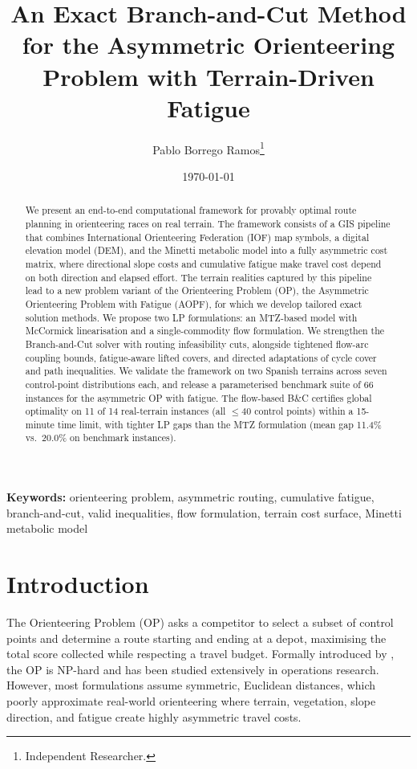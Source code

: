 \documentclass[11pt,a4paper]{article}
\title{An Exact Branch-and-Cut Method for the Asymmetric Orienteering Problem with Terrain-Driven Fatigue}
\author{
  Pablo Borrego Ramos\thanks{Independent Researcher.}
}
\date{\today}
\begin{document}
\maketitle

\begin{abstract}
We present an end-to-end computational framework for provably optimal route planning in orienteering races on real terrain.
The framework consists of a GIS pipeline that combines International Orienteering Federation (IOF) map symbols, a digital elevation model (DEM), and the Minetti metabolic model into a fully asymmetric cost matrix, where directional slope costs and cumulative fatigue make travel cost depend on both direction and elapsed effort.
The terrain realities captured by this pipeline lead to a new problem variant of the Orienteering Problem (OP), the Asymmetric Orienteering Problem with Fatigue (AOPF), for which we develop tailored exact solution methods.
We propose two LP formulations: an MTZ-based model with McCormick linearisation and a single-commodity flow formulation.
We strengthen the Branch-and-Cut solver with routing infeasibility cuts, alongside tightened flow-arc coupling bounds, fatigue-aware lifted covers, and directed adaptations of cycle cover and path inequalities.
We validate the framework on two Spanish terrains across seven control-point distributions each, and release a parameterised benchmark suite of 66 instances for the asymmetric OP with fatigue.
The flow-based B\&C certifies global optimality on 11 of 14 real-terrain instances (all $\leq 40$ control points) within a 15-minute time limit, with tighter LP gaps than the MTZ formulation (mean gap 11.4\% vs.\ 20.0\% on benchmark instances).
\end{abstract}

\noindent\textbf{Keywords:} orienteering problem, asymmetric routing, cumulative fatigue, branch-and-cut, valid inequalities, flow formulation, terrain cost surface, Minetti metabolic model

\section{Introduction}
\label{sec:intro}

The Orienteering Problem (OP) asks a competitor to select a subset of control points and determine a route starting and ending at a depot, maximising the total score collected while respecting a travel budget.
Formally introduced by \citet{tsiligirides1984heuristic}, the OP is NP-hard and has been studied extensively in operations research.
However, most formulations assume symmetric, Euclidean distances, which poorly approximate real-world orienteering where terrain, vegetation, slope direction, and fatigue create highly asymmetric travel costs.
\end{document}
